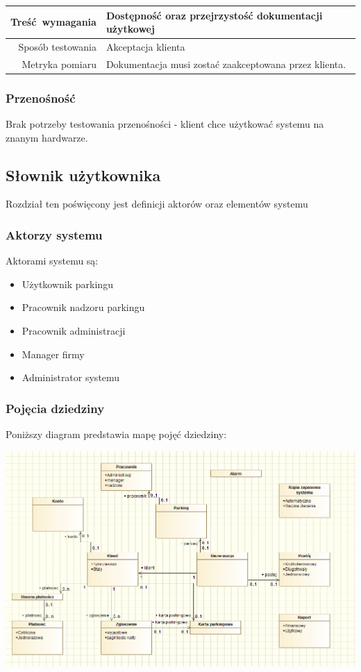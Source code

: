 \documentclass[paper=a4, fontsize=11pt]{scrartcl} %
\begin{document}
\vspace{10 mm}

\begin{tabularx}{\textwidth}{|r|X|}
  \hline
Treść wymagania & Dostępność oraz przejrzystość dokumentacji użytkowej\\ 
  \hline
Sposób testowania & Akceptacja klienta\\ 
  \hline
Metryka pomiaru & Dokumentacja musi zostać zaakceptowana przez klienta.\\ 
  \hline
\end{tabularx}

\subsubsection{Przenośność}

Brak potrzeby testowania przenośności - klient chce użytkować systemu na znanym hardwarze.

\subsection{Słownik użytkownika}

Rozdział ten poświęcony jest definicji aktorów oraz elementów systemu 

\subsubsection{Aktorzy systemu}

Aktorami systemu są:

\begin{itemize}
  \item Użytkownik parkingu
  \item Pracownik nadzoru parkingu
  \item Pracownik administracji
  \item Manager firmy
  \item Administrator systemu 
\end{itemize}

\subsubsection{Pojęcia dziedziny}

Poniższy diagram predstawia mapę pojęć dziedziny:

\includegraphics[scale=0.5]{slownik}
\end{document}
